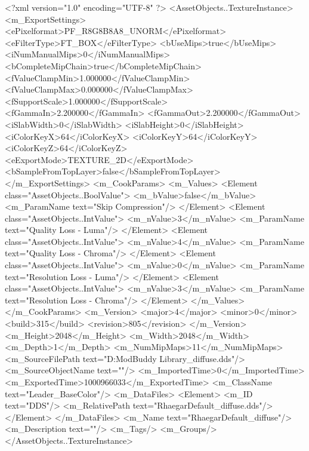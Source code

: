 <?xml version="1.0" encoding="UTF-8" ?>
<AssetObjects..TextureInstance>
	<m_ExportSettings>
		<ePixelformat>PF_R8G8B8A8_UNORM</ePixelformat>
		<eFilterType>FT_BOX</eFilterType>
		<bUseMips>true</bUseMips>
		<iNumManualMips>0</iNumManualMips>
		<bCompleteMipChain>true</bCompleteMipChain>
		<fValueClampMin>1.000000</fValueClampMin>
		<fValueClampMax>0.000000</fValueClampMax>
		<fSupportScale>1.000000</fSupportScale>
		<fGammaIn>2.200000</fGammaIn>
		<fGammaOut>2.200000</fGammaOut>
		<iSlabWidth>0</iSlabWidth>
		<iSlabHeight>0</iSlabHeight>
		<iColorKeyX>64</iColorKeyX>
		<iColorKeyY>64</iColorKeyY>
		<iColorKeyZ>64</iColorKeyZ>
		<eExportMode>TEXTURE_2D</eExportMode>
		<bSampleFromTopLayer>false</bSampleFromTopLayer>
	</m_ExportSettings>
	<m_CookParams>
		<m_Values>
			<Element class="AssetObjects..BoolValue">
				<m_bValue>false</m_bValue>
				<m_ParamName text="Skip Compression"/>
			</Element>
			<Element class="AssetObjects..IntValue">
				<m_nValue>3</m_nValue>
				<m_ParamName text="Quality Loss - Luma"/>
			</Element>
			<Element class="AssetObjects..IntValue">
				<m_nValue>4</m_nValue>
				<m_ParamName text="Quality Loss - Chroma"/>
			</Element>
			<Element class="AssetObjects..IntValue">
				<m_nValue>0</m_nValue>
				<m_ParamName text="Resolution Loss - Luma"/>
			</Element>
			<Element class="AssetObjects..IntValue">
				<m_nValue>3</m_nValue>
				<m_ParamName text="Resolution Loss - Chroma"/>
			</Element>
		</m_Values>
	</m_CookParams>
	<m_Version>
		<major>4</major>
		<minor>0</minor>
		<build>315</build>
		<revision>805</revision>
	</m_Version>
	<m_Height>2048</m_Height>
	<m_Width>2048</m_Width>
	<m_Depth>1</m_Depth>
	<m_NumMipMaps>11</m_NumMipMaps>
	<m_SourceFilePath text="D:\MyDocuments\Firaxis ModBuddy Library\Rhaegar\RhaegarTargaryen\Maps\RhaegarDefault_diffuse.dds"/>
	<m_SourceObjectName text=""/>
	<m_ImportedTime>0</m_ImportedTime>
	<m_ExportedTime>1000966033</m_ExportedTime>
	<m_ClassName text="Leader_BaseColor"/>
	<m_DataFiles>
		<Element>
			<m_ID text="DDS"/>
			<m_RelativePath text="RhaegarDefault_diffuse.dds"/>
		</Element>
	</m_DataFiles>
	<m_Name text="RhaegarDefault_diffuse"/>
	<m_Description text=""/>
	<m_Tags/>
	<m_Groups/>
</AssetObjects..TextureInstance>

